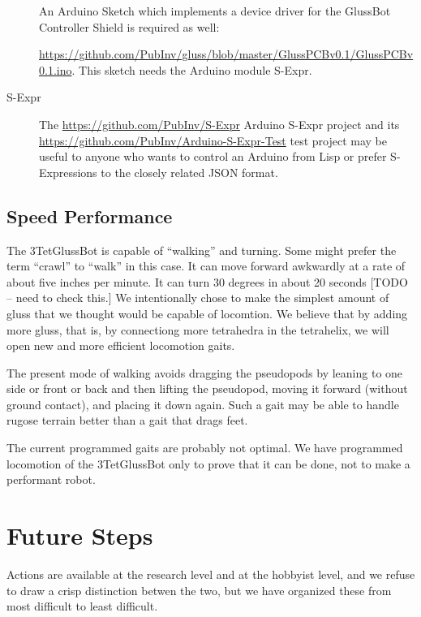 \documentclass[12pt]{article}
\begin{document}
\begin{description}
An Arduino Sketch which implements a device driver for the GlussBot Controller Shield is required as well:

\href{https://github.com/PubInv/gluss/blob/master/GlussPCBv0.1/GlussPCBv0.1.ino}
     {https://github.com/PubInv/gluss/blob/master/GlussPCBv0.1/GlussPCBv0.1.ino}.
     This sketch needs the Arduino module S-Expr.
     
\item [S-Expr]
  The \href{https://github.com/PubInv/S-Expr}{https://github.com/PubInv/S-Expr} Arduino S-Expr project and its
  \href{https://github.com/PubInv/Arduino-S-Expr-Test}{https://github.com/PubInv/Arduino-S-Expr-Test} test project
  may be useful to anyone who wants to control an Arduino from Lisp or prefer S-Expressions to the closely related JSON format.

  
\end{description}

\subsection{Speed Performance}

The 3TetGlussBot is capable of ``walking'' and turning. Some might prefer the term ``crawl'' to ``walk'' in
this case. It can move forward awkwardly at a rate
of about five inches per minute. It can turn 30 degrees in about 20 seconds [TODO -- need to check this.]
We intentionally chose to make the simplest amount of gluss that we thought would be capable of locomtion.
We believe that by adding more gluss, that is, by connectiong more tetrahedra in the tetrahelix,
we will open new and more efficient locomotion gaits.

The present mode of walking avoids dragging the pseudopods by leaning to one side or front or back and
then lifting the pseudopod, moving it forward (without ground contact), and placing it down again.
Such a gait may be able to handle rugose terrain better than a gait that drags feet.

The current programmed gaits are probably not optimal.
We have programmed locomotion of the 3TetGlussBot only to prove that it can be done, not to make
a performant robot.


\section{Future Steps}

Actions are available at the research level and at the hobbyist level, and we refuse to draw
a crisp distinction betwen the two, but we have organized these from most difficult to least
difficult.
\end{document}
